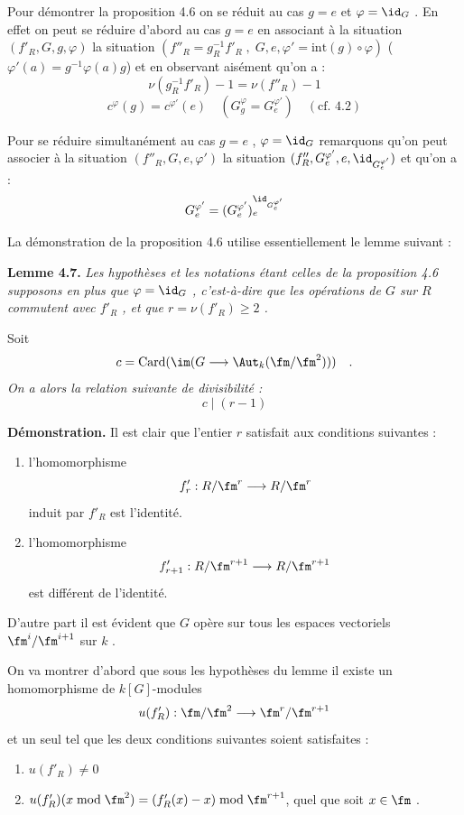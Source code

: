 \medskip

Pour démontrer la proposition 4.6 on se réduit au cas $g = e$ et $\varphi = \id_G$ . En effet on peut se réduire d'abord au cas $g = e$ en associant à la situation $(f'_R, G, g, \varphi)$ la situation $(f''_R = g_R^{-1}f'_R \; , \; G, e, \varphi' = \mathrm{int}(g) \circ \varphi)$ ($\varphi'(a) = g^{-1}\varphi(a)g$) et en observant aisément qu'on a :
\[
\nu(g_R^{-1}f'_R) - 1 = \nu(f''_R) - 1
\]
\[
c^\varphi(g) = c^{\varphi'}(e) \quad (G_g^\varphi = G_e^{\varphi'}) \quad (\text{cf. 4.2})
\]

Pour se réduire simultanément au cas $g = e$ , $\varphi = \id_G$ remarquons qu'on peut associer à la situation $(f''_R, G, e, \varphi')$ la situation $(f''_R, G_e^{\varphi'}, e, \id_{G_e^{\varphi'}})$ et qu'on a :
\[
G_e^{\varphi'} = (G_e^{\varphi'})_e^{\id_{G_e^{\varphi'}}}
\]

La démonstration de la proposition 4.6 utilise essentiellement le lemme suivant :

\medskip
\noindent
\textbf{Lemme 4.7.} \emph{Les hypothèses et les notations étant celles de la proposition 4.6 supposons en plus que $\varphi = \id_G$ , c'est-à-dire que les opérations de $G$ sur $R$ commutent avec $f'_R$ , et que $r = \nu(f'_R) \geq 2$ .}

Soit
\emph{\[
c = \operatorname{Card}(\im(G \longrightarrow \Aut_k(\fm/\fm^2))) \quad .
\]
On a alors la relation suivante de divisibilité :
\[
c \mid (r - 1)
\]}

\medskip

\noindent
\textbf{Démonstration.} Il est clair que l'entier $r$ satisfait aux conditions suivantes :
\begin{enumerate}
\item[a)] l'homomorphisme
\[
f'_r : R/\fm^r \longrightarrow R/\fm^r
\]
induit par $f'_R$ est l'identité.
\item[b)] l'homomorphisme
\[
f'_{r+1} : R/\fm^{r+1} \longrightarrow R/\fm^{r+1}
\]
est différent de l'identité.
\end{enumerate}

D'autre part il est évident que $G$ opère sur tous les espaces vectoriels $\fm^i/\fm^{i+1}$ sur $k$ .

On va montrer d'abord que sous les hypothèses du lemme il existe un homomorphisme de $k[G]$-modules
\[
u(f'_R) : \fm/\fm^2 \longrightarrow \fm^r/\fm^{r+1}
\]
et un seul tel que les deux conditions suivantes soient satisfaites :
\begin{enumerate}
\item[1)] $u(f'_R) \neq 0$
\item[2)] $u(f'_R)(x \bmod \fm^2) = (f'_R(x) - x) \bmod \fm^{r+1}$, quel que soit $x \in \fm$ .
\end{enumerate}

